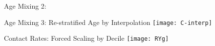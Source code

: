 \begin{frame}{Age Mixing 2: \Polymod
  }
  \centering
\end{frame}
\begin{frame}{Age Mixing 3: Re-stratified Age by Interpolation}
  \centering\texttt{[image: C-interp]}
\end{frame}
\begin{frame}{Contact Rates: Forced Scaling by Decile}
  \centering\texttt{[image: RYg]}
\end{frame}
